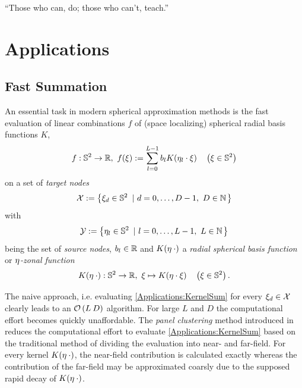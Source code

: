 \begin{savequote}[8cm]
  ``Those who can, do; those who can't, teach.''
\end{savequote}
\makeatletter
\chapter{Applications}
\label{Applications}

\section{Fast Summation}

An essential task in modern spherical approximation methods is the fast evaluation of linear combinations $f$ of (space localizing) spherical radial basis functions $K$,  
\begin{equation}
  \label{Applications:KernelSum}
  f: \mathbb{S}^2 \rightarrow \mathbb{R},\ f{\hspace{-0.4ex}}\left(\xi\right) := \sum_{l = 0}^{L-1} 
    b_{l} K{\hspace{-0.4ex}}\left(\mathbf{\eta}_{l} \cdot \mathbf{\xi}\right) \quad \left(\mathbf{\xi} \in \mathbb{S}^2\right)
\end{equation}
on a set of \emph{target nodes} 
$$
  \mathcal{X} := \left\{\mathbf{\xi}_{d} \in \mathbb{S}^2\ \left|\ d=0,\ldots,D-1,\ D \in \mathbb{N}\right.\right\rbrace
$$ 
with 
$$
  \mathcal{Y} := \left\{\mathbf{\eta}_{l} \in \mathbb{S}^2\ \left|\ l = 0,\ldots,L-1,\ L \in \mathbb{N}\right.\right\rbrace
$$
being the set of \emph{source nodes}, $b_{l} \in \mathbb{R}$ and $K{\hspace{-0.4ex}}\left(\mathbf{\eta} \: \cdot\right)$ a \emph{radial spherical basis function} or \emph{$\mathbf{\eta}$-zonal function} 
\[
  K{\hspace{-0.4ex}}\left(\mathbf{\eta} \: \cdot\right): \mathbb{S}^2 \rightarrow \mathbb{R},\ \mathbf{\xi} \mapsto K{\hspace{-0.4ex}}\left(\mathbf{\eta} \cdot \mathbf{\xi}\right) \quad \left(\mathbf{\xi} \in \mathbb{S}^2\right).\]

The naive approach, i.e. evaluating \eqref{Applications:KernelSum} for every $\mathbf{\xi}_{d} \in \mathcal{X}$ clearly leads to an $\mathcal{O}\left(L\:D\right)$ algorithm. For large $L$ and $D$ the computational effort becomes quickly unaffordable.
The \emph{panel clustering} method introduced in \cite{FrGlSch98} reduces the computational effort to evaluate \eqref{Applications:KernelSum} based on the traditional method of dividing the evaluation into near- and far-field. For every kernel $K{\hspace{-0.4ex}}\left(\mathbf{\eta} \: \cdot\right)$, the near-field contribution is calculated exactly whereas the contribution of the far-field may be approximated coarsly due to the supposed rapid decay of $K{\hspace{-0.4ex}}\left(\mathbf{\eta} \: \cdot\right)$. 

